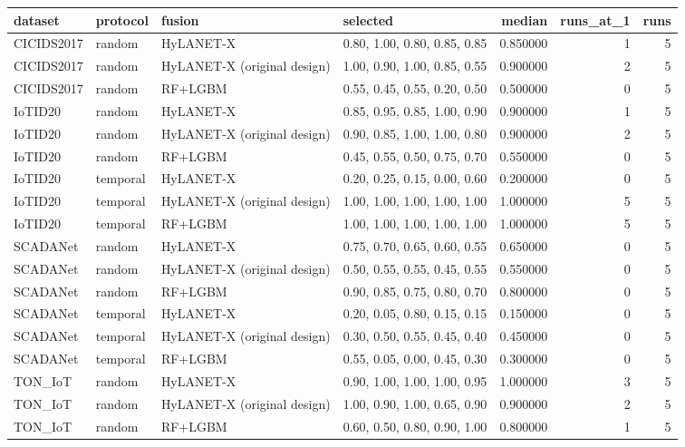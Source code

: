 \begin{tabular}{llllrrr}
\toprule
dataset & protocol & fusion & selected & median & runs\_at\_1 & runs \\
\midrule
CICIDS2017 & random & HyLANET-X & 0.80, 1.00, 0.80, 0.85, 0.85 & 0.850000 & 1 & 5 \\
CICIDS2017 & random & HyLANET-X (original design) & 1.00, 0.90, 1.00, 0.85, 0.55 & 0.900000 & 2 & 5 \\
CICIDS2017 & random & RF+LGBM & 0.55, 0.45, 0.55, 0.20, 0.50 & 0.500000 & 0 & 5 \\
IoTID20 & random & HyLANET-X & 0.85, 0.95, 0.85, 1.00, 0.90 & 0.900000 & 1 & 5 \\
IoTID20 & random & HyLANET-X (original design) & 0.90, 0.85, 1.00, 1.00, 0.80 & 0.900000 & 2 & 5 \\
IoTID20 & random & RF+LGBM & 0.45, 0.55, 0.50, 0.75, 0.70 & 0.550000 & 0 & 5 \\
IoTID20 & temporal & HyLANET-X & 0.20, 0.25, 0.15, 0.00, 0.60 & 0.200000 & 0 & 5 \\
IoTID20 & temporal & HyLANET-X (original design) & 1.00, 1.00, 1.00, 1.00, 1.00 & 1.000000 & 5 & 5 \\
IoTID20 & temporal & RF+LGBM & 1.00, 1.00, 1.00, 1.00, 1.00 & 1.000000 & 5 & 5 \\
SCADANet & random & HyLANET-X & 0.75, 0.70, 0.65, 0.60, 0.55 & 0.650000 & 0 & 5 \\
SCADANet & random & HyLANET-X (original design) & 0.50, 0.55, 0.55, 0.45, 0.55 & 0.550000 & 0 & 5 \\
SCADANet & random & RF+LGBM & 0.90, 0.85, 0.75, 0.80, 0.70 & 0.800000 & 0 & 5 \\
SCADANet & temporal & HyLANET-X & 0.20, 0.05, 0.80, 0.15, 0.15 & 0.150000 & 0 & 5 \\
SCADANet & temporal & HyLANET-X (original design) & 0.30, 0.50, 0.55, 0.45, 0.40 & 0.450000 & 0 & 5 \\
SCADANet & temporal & RF+LGBM & 0.55, 0.05, 0.00, 0.45, 0.30 & 0.300000 & 0 & 5 \\
TON\_IoT & random & HyLANET-X & 0.90, 1.00, 1.00, 1.00, 0.95 & 1.000000 & 3 & 5 \\
TON\_IoT & random & HyLANET-X (original design) & 1.00, 0.90, 1.00, 0.65, 0.90 & 0.900000 & 2 & 5 \\
TON\_IoT & random & RF+LGBM & 0.60, 0.50, 0.80, 0.90, 1.00 & 0.800000 & 1 & 5 \\
\bottomrule
\end{tabular}

